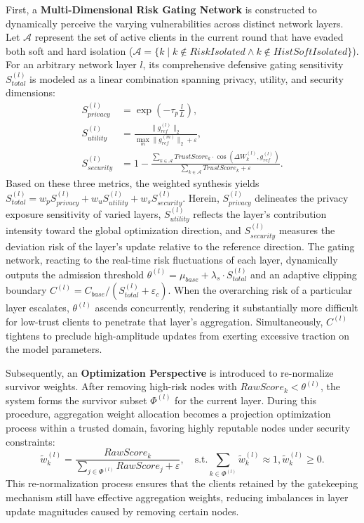 \documentclass[runningheads,orivec]{llncs}
\begin{document}
First, a \textbf{Multi-Dimensional Risk Gating Network} is constructed to dynamically perceive the varying vulnerabilities across distinct network layers. Let $\mathcal{A}$ represent the set of active clients in the current round that have evaded both soft and hard isolation ($\mathcal{A} = \{k \mid k \notin RiskIsolated \land k \notin HistSoftIsolated\}$). For an arbitrary network layer $l$, its comprehensive defensive gating sensitivity $S_{total}^{(l)}$ is modeled as a linear combination spanning privacy, utility, and security dimensions:
\begin{align}
    S_{privacy}^{(l)}  & = \exp\left(-\tau_{p} \frac{l}{L}\right),                                                                                                          \\
    S_{utility}^{(l)}  & = \frac{\|g_{ref}^{(l)}\|_{2}}{\max_{m}\|g_{ref}^{(m)}\|_{2} + \varepsilon},                                                                       \\
    S_{security}^{(l)} & = 1 - \frac{\sum_{k\in\mathcal{A}}TrustScore_{k}\cdot\cos(\Delta W_{k}^{(l)}, g_{ref}^{(l)})}{\sum_{k\in\mathcal{A}}TrustScore_{k} + \varepsilon}.
\end{align}
Based on these three metrics, the weighted synthesis yields $S_{total}^{(l)} = w_p S_{privacy}^{(l)} + w_u S_{utility}^{(l)} + w_s S_{security}^{(l)}$. Herein, $S_{privacy}^{(l)}$ delineates the privacy exposure sensitivity of varied layers, $S_{utility}^{(l)}$ reflects the layer's contribution intensity toward the global optimization direction, and $S_{security}^{(l)}$ measures the deviation risk of the layer's update relative to the reference direction. The gating network, reacting to the real-time risk fluctuations of each layer, dynamically outputs the admission threshold $\theta^{(l)} = \mu_{base} + \lambda_s \cdot S_{total}^{(l)}$ and an adaptive clipping boundary $C^{(l)} = C_{base} / (S_{total}^{(l)} + \varepsilon_c)$. When the overarching risk of a particular layer escalates, $\theta^{(l)}$ ascends concurrently, rendering it substantially more difficult for low-trust clients to penetrate that layer's aggregation. Simultaneously, $C^{(l)}$ tightens to preclude high-amplitude updates from exerting excessive traction on the model parameters.

Subsequently, an \textbf{Optimization Perspective} is introduced to re-normalize survivor weights. After removing high-risk nodes with $RawScore_k < \theta^{(l)}$, the system forms the survivor subset $\Phi^{(l)}$ for the current layer. During this procedure, aggregation weight allocation becomes a projection optimization process within a trusted domain, favoring highly reputable nodes under security constraints:
\begin{equation}
    \tilde{w}_{k}^{(l)} = \frac{RawScore_{k}}{\sum_{j\in\Phi^{(l)}}RawScore_{j} + \varepsilon}, \quad \text{s.t.} \sum_{k\in\Phi^{(l)}} \tilde{w}_{k}^{(l)} \approx 1, \tilde{w}_{k}^{(l)} \ge 0.
\end{equation}
This re-normalization process ensures that the clients retained by the gatekeeping mechanism still have effective aggregation weights, reducing imbalances in layer update magnitudes caused by removing certain nodes.
\end{document}
